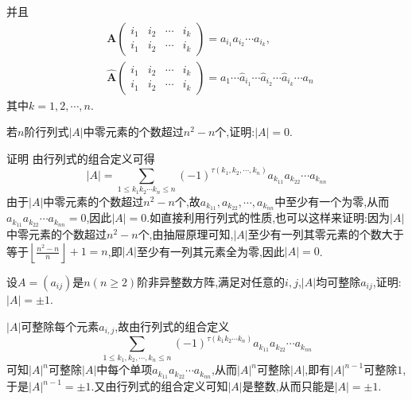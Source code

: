\documentclass[lang=cn,newtx,10pt,scheme=chinese]{elegantbook}
\begin{document}
\begin{conclusion}
并且
\begin{align*}
&\boldsymbol{A}\left(\begin{matrix}
i_1 & i_2 & \cdots & i_k\\
i_1 & i_2 & \cdots & i_k
\end{matrix}\right) = a_{i_1}a_{i_2}\cdots a_{i_k},
\\
&\widehat{\boldsymbol{A}}\left(\begin{matrix}
i_1 & i_2 & \cdots & i_k\\
i_1 & i_2 & \cdots & i_k
\end{matrix}\right) = a_1\cdots \hat{a}_{i_1}\cdots \hat{a}_{i_2}\cdots \hat{a}_{i_k}\cdots a_n\,
\end{align*}
其中\(k = 1,2,\cdots,n\).
\end{conclusion}

\begin{exercise}
若\(n\)阶行列式\(\vert A\vert\)中零元素的个数超过\(n^2 - n\)个,证明:\(\vert A\vert = 0\).
\end{exercise}
\begin{solution}
证明 由行列式的组合定义可得
\[
|A|=\sum_{1\leq k_1k_2\cdots k_n\leq n}(-1)^{\tau (k_1,k_2,\cdots,k_n)}a_{k_{11}}a_{k_{22}}\cdots a_{k_{nn}}
\]
由于\(|A|\)中零元素的个数超过\(n^2 - n\)个,故\(a_{k_{11}},a_{k_{22}},\cdots,a_{k_{nn}}\)中至少有一个为零,从而\(a_{k_{11}}a_{k_{22}}\cdots a_{k_{nn}} = 0\),因此\(|A| = 0\).如直接利用行列式的性质,也可以这样来证明:因为\(|A|\)中零元素的个数超过\(n^2 - n\)个,由抽屉原理可知,\(|A|\)至少有一列其零元素的个数大于等于\(\left\lfloor\frac{n^2 - n}{n}\right\rfloor+ 1=n\),即\(|A|\)至少有一列其元素全为零,因此\(|A| = 0\).
\end{solution}

\begin{exercise}
设\(A=(a_{ij})\)是\(n(n\geq2)\)阶非异整数方阵,满足对任意的\(i,j\),\(\vert A\vert\)均可整除\(a_{ij}\),证明:\(\vert A\vert=\pm1\).
\end{exercise}
\begin{solution}
\(\vert A\vert\)可整除每个元素\(a_{i,j}\),故由行列式的组合定义
\[
\sum_{1\le k_1,k_2,\cdots ,k_n\le n}{\left( -1 \right) ^{\tau \left( k_1k_2\cdots k_n \right)}a_{k_{11}}a_{k_{22}}\cdots a_{k_{nn}}}
\]
可知\(\vert A\vert^n\)可整除\(\vert A\vert\)中每个单项\(a_{k_{11}}a_{k_{22}}\cdots a_{k_{nn}}\),从而\(\vert A\vert^n\)可整除\(\vert A\vert\),即有\(\vert A\vert^{n - 1}\)可整除\(1\),于是\(\vert A\vert^{n - 1}=\pm1\).又由行列式的组合定义可知\(\vert A\vert\)是整数,从而只能是\(\vert A\vert=\pm1\).
\end{solution}
\end{document}
